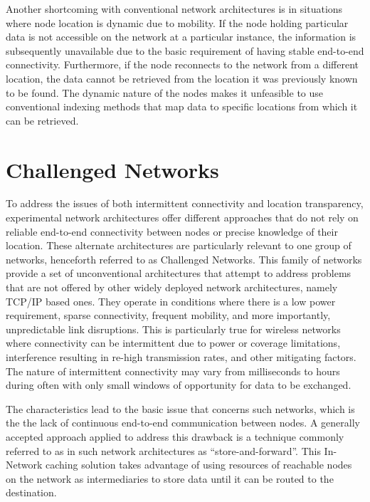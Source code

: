 \documentclass[a4paper,12pt]{report}      %
\begin{document}
Another shortcoming with conventional network architectures is in situations where node location is dynamic due to mobility. If the node holding particular data is not accessible on the network at a particular instance, the information is subsequently unavailable due to the basic requirement of having stable end-to-end connectivity. Furthermore, if the node reconnects to the network from a different location, the data cannot be retrieved from the location it was previously known to be found. The dynamic nature of the nodes makes it unfeasible to use conventional indexing methods that map data to specific locations from which it can be retrieved.

\section{Challenged Networks}  

To address the issues of both intermittent connectivity and location transparency, experimental network
architectures offer different approaches that do not rely on reliable end-to-end connectivity between
nodes or precise knowledge of their location. These alternate architectures are particularly relevant to
one group of networks, henceforth referred to as Challenged Networks. This family of networks
provide a set of unconventional architectures that attempt to address problems that are not offered by
other widely deployed network architectures, namely TCP/IP based ones. They operate in conditions
where there is a low power requirement, sparse connectivity, frequent mobility, and more importantly,
unpredictable link disruptions. This is particularly true for wireless networks where connectivity can be
intermittent due to power or coverage limitations, interference resulting in re-high transmission rates,
and other mitigating factors. The nature of intermittent connectivity may vary from milliseconds to
hours during often with only small windows of opportunity for data to be exchanged. \cite{DTNarch}

The characteristics lead to the basic issue that concerns such networks, which is the the lack of
continuous end-to-end communication between nodes. A generally accepted approach applied to
address this drawback is a technique commonly referred to as in such network architectures as “store-and-forward”. This In-Network caching solution takes advantage of using resources of reachable nodes
on the network as intermediaries to store data until it can be routed to the destination.
\end{document}
